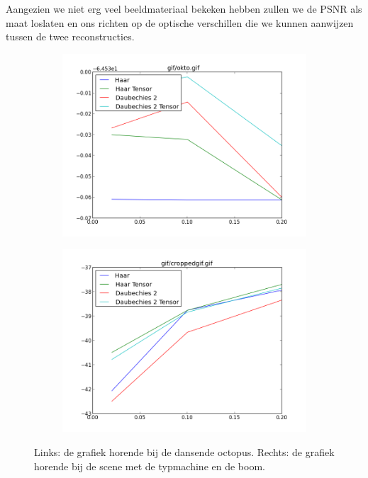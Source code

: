 Aangezien we niet erg veel beeldmateriaal bekeken hebben zullen we de PSNR als maat loslaten en ons richten 
op de optische verschillen die we kunnen aanwijzen tussen de twee reconstructies.

\begin{figure}[h]
\centering
\begin{subfigure}[t]{0.48\textwidth}
\includegraphics[width=\linewidth]{plaatjes/cockto.png}
\end{subfigure}
\begin{subfigure}[t]{0.48\textwidth}
\includegraphics[width=\linewidth]{plaatjes/croppedgif.png}
\end{subfigure}
\caption{Links: de grafiek horende bij de dansende octopus. Rechts: de grafiek horende bij de scene met de typmachine en de boom.}
\label{fig:cockto}
\end{figure}

